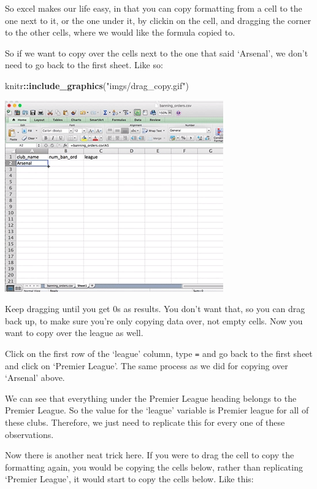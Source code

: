 \documentclass[]{book}
\newenvironment{Shaded}{\begin{snugshade}}{\end{snugshade}}
\newcommand{\KeywordTok}[1]{\textcolor[rgb]{0.13,0.29,0.53}{\textbf{#1}}}
\newcommand{\NormalTok}[1]{#1}
\newcommand{\OperatorTok}[1]{\textcolor[rgb]{0.81,0.36,0.00}{\textbf{#1}}}
\newcommand{\StringTok}[1]{\textcolor[rgb]{0.31,0.60,0.02}{#1}}
\theoremstyle{definition}
\theoremstyle{definition}
\theoremstyle{definition}
\theoremstyle{remark}
\begin{document}
So excel makes our life easy, in that you can copy formatting from a
cell to the one next to it, or the one under it, by clickin on the cell,
and dragging the corner to the other cells, where we would like the
formula copied to.

So if we want to copy over the cells next to the one that said
`Arsenal', we don't need to go back to the first sheet. Like so:

\begin{Shaded}
\begin{Highlighting}[]
\NormalTok{knitr}\OperatorTok{::}\KeywordTok{include_graphics}\NormalTok{(}\StringTok{"imgs/drag_copy.gif"}\NormalTok{)}
\end{Highlighting}
\end{Shaded}

\includegraphics{imgs/drag_copy.gif}

Keep dragging until you get 0s as results. You don't want that, so you
can drag back up, to make sure you're only copying data over, not empty
cells. Now you want to copy over the league as well.

Click on the first row of the `league' column, type \texttt{=} and go
back to the first sheet and click on `Premier League'. The same process
as we did for copying over `Arsenal' above.

We can see that everything under the Premier League heading belongs to
the Premier League. So the value for the `league' variable is Premier
league for all of these clubs. Therefore, we just need to replicate this
for every one of these observations.

Now there is another neat trick here. If you were to drag the cell to
copy the formatting again, you would be copying the cells below, rather
than replicating `Premier League', it would start to copy the cells
below. Like this:
\end{document}
